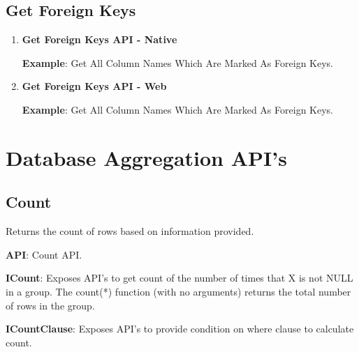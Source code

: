 	\subsection{Get Foreign Keys}

		\begin{enumerate}
	
			\item \small \textbf{Get Foreign Keys API - Native}
				

				\par
				\textbf{Example}: Get All Column Names Which Are Marked As Foreign Keys.
					

			\item \small \textbf{Get Foreign Keys API - Web}
				

				\par
				\textbf{Example}: Get All Column Names Which Are Marked As Foreign Keys.
					
	
		\end{enumerate}



\section{Database Aggregation API's}


	\subsection{Count}
		\par
		Returns the count of rows based on information provided.

			\textbf{API}: Count API.
				
		
			\textbf{ICount}:  Exposes API's to get count of the number of times that X is not NULL in a group.
						 The count(*) function (with no arguments) returns the total number of rows in the group.

				

			
			\textbf{ICountClause}: Exposes API's to provide condition on where clause to calculate count.
				

